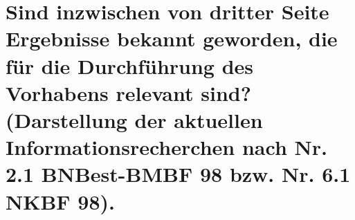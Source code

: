 \section{Sind inzwischen von dritter Seite Ergebnisse bekannt geworden, die für die Durchführung des Vorhabens relevant sind? (Darstellung der aktuellen Informationsrecherchen nach Nr. 2.1 BNBest-BMBF 98 bzw. Nr. 6.1 NKBF 98).}

